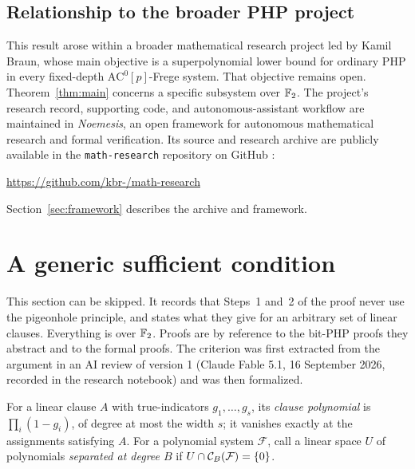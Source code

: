 \subsection{Relationship to the broader PHP project}
This result arose within a broader mathematical research project led by
Kamil Braun, whose main objective is a superpolynomial lower
bound for ordinary PHP in every fixed-depth
\(\mathrm{AC}^0[p]\)-Frege system. That objective remains open.
Theorem~\ref{thm:main} concerns a specific subsystem over \(\mathbb F_2\).
The project's research record, supporting code, and autonomous-assistant
workflow are maintained in \emph{Noemesis}, an open framework for autonomous
mathematical research and formal verification. Its source and research archive
are publicly available in the \texttt{math-research} repository on GitHub
\cite{Repo}:
\begin{center}
 \url{https://github.com/kbr-/math-research}
\end{center}
Section~\ref{sec:framework} describes the archive and framework.

\section{A generic sufficient condition}\label{sec:generic}

This section can be skipped. It records that Steps~1 and~2 of the proof
never use the pigeonhole principle, and states what they give for an
arbitrary set of linear clauses. Everything is over \(\mathbb F_2\). Proofs are by
reference to the bit-PHP proofs they abstract and to the formal proofs.
The criterion was first extracted from the argument in an AI review of
version 1 (Claude Fable 5.1, 16 September 2026, recorded in the research
notebook) and was then formalized.

For a linear clause \(A\) with true-indicators \(g_1,\ldots,g_s\), its
\emph{clause polynomial} is \(\prod_i(1-g_i)\), of degree at most the width
\(s\); it vanishes exactly at the assignments satisfying \(A\). For a
polynomial system \(\mathcal F\), call a linear space \(U\) of polynomials
\emph{separated at degree \(B\)} if \(U\cap\mathcal C_B(\mathcal F)=\{0\}\).

